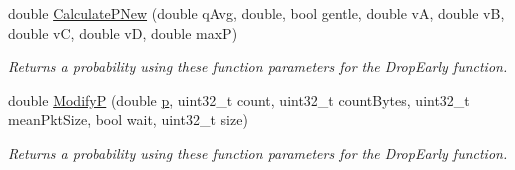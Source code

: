 \begin{DoxyCompactItemize}
double \hyperlink{classns3_1_1RedQueueDisc_a46c9c2c961936c0423e28afd07a2c4cf}{Calculate\+P\+New} (double q\+Avg, double, bool gentle, double vA, double vB, double vC, double vD, double maxP)
\begin{DoxyCompactList}\small\item\em Returns a probability using these function parameters for the Drop\+Early function. \end{DoxyCompactList}\item 
double \hyperlink{classns3_1_1RedQueueDisc_a70b8f8954389cbc428531803e24ed5ee}{ModifyP} (double \hyperlink{lte__link__budget__x2__handover__measures_8m_ac9de518908a968428863f829398a4e62}{p}, uint32\+\_\+t count, uint32\+\_\+t count\+Bytes, uint32\+\_\+t mean\+Pkt\+Size, bool wait, uint32\+\_\+t size)
\begin{DoxyCompactList}\small\item\em Returns a probability using these function parameters for the Drop\+Early function. \end{DoxyCompactList}\end{DoxyCompactItemize}
